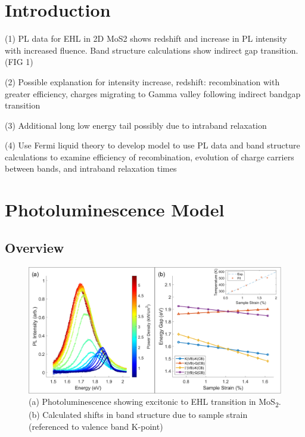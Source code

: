 \documentclass[aps,prl,preprint,superscriptaddress]{revtex4-2}
\begin{document}
\date{\today}

\begin{abstract}
[INSERT ABSTRACT HERE]
\end{abstract}

\maketitle

\section{Introduction\label{Intro}}


(1) PL data for EHL in 2D MoS2 shows redshift and increase in PL intensity with increased fluence. Band structure calculations show indirect gap transition. (FIG 1)

(2) Possible explanation for intensity increase, redshift: recombination with greater efficiency, charges migrating to Gamma valley following indirect bandgap transition

(3) Additional long low energy tail possibly due to intraband relaxation

(4) Use Fermi liquid theory to develop model to use PL data and band structure calculations to examine efficiency of recombination, evolution of charge carriers between bands, and intraband relaxation times





\section{Photoluminescence Model}

\subsection{Overview}

\begin{figure}[H]
	\includegraphics[width=0.95\linewidth]{fig_fig1.png}
	\caption{(a) Photoluminescence showing excitonic to EHL transition in MoS\textsubscript{2}. (b) Calculated shifts in band structure due to sample strain (referenced to valence band K-point)}
	\label{fig:schematic}
\end{figure}
\end{document}
